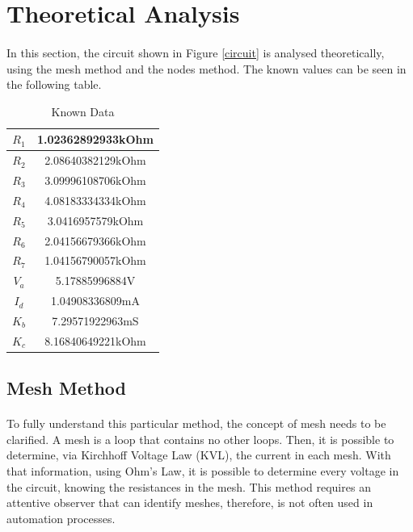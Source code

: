\section{Theoretical Analysis}
\label{sec:analysis}
\paragraph{}
\par In this section, the circuit shown in Figure \ref{circuit} is analysed
theoretically, using the mesh method and the nodes method. The known values can be seen in the following table.
\begin{table}[H]
    \centering
    \begin{tabular}{|c|c|}
    \hline
        $R_1$ & 1.02362892933kOhm \\ \hline 
        $R_2$ & 2.08640382129kOhm \\ \hline
        $R_3$ & 3.09996108706kOhm \\ \hline
        $R_4$ & 4.08183334334kOhm \\ \hline
        $R_5$ & 3.0416957579kOhm  \\ \hline
        $R_6$ & 2.04156679366kOhm \\ \hline
        $R_7$ & 1.04156790057kOhm \\ \hline
        $V_a$ & 5.17885996884V \\ \hline
        $I_d$ & 1.04908336809mA \\ \hline
        $K_b$ & 7.29571922963mS \\ \hline
        $K_c$ & 8.16840649221kOhm \\ \hline	
    \end{tabular}
    \caption{Known Data}
    \label{data}
\end{table}
\subsection{Mesh Method}
\paragraph{}
\par To fully understand this particular method, the concept of mesh needs to be clarified. A mesh is a loop that contains no other loops. Then, it is possible to determine, via Kirchhoff Voltage Law (KVL), the current in each mesh. With that information, using Ohm's Law, it is possible to determine every voltage in the circuit, knowing the resistances in the mesh. This method requires an attentive observer that can identify meshes, therefore, is not often used in automation processes.

